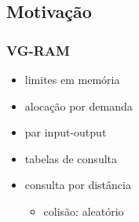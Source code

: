 \documentclass{beamer}
\begin{document}
\subsection{Motivação}
\begin{frame}
    \frametitle{VG-RAM}
    \begin{itemize}
        \item limites em memória
        \item alocação por demanda
        \item par input-output
        \item tabelas de consulta
        \item consulta por distância
            \begin{itemize}
                \item colisão: aleatório
            \end{itemize}
    \end{itemize}
\end{frame}
\end{document}

